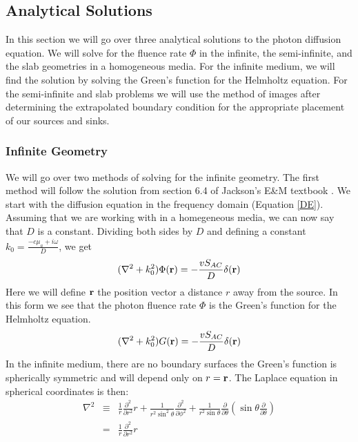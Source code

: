 \subsection{Analytical Solutions}
In this section we will go over three analytical solutions to the photon diffusion equation. We will solve for the fluence rate $\Phi$ in the infinite, the semi-infinite, and the slab geometries in a homogeneous media. For the infinite medium, we will find the solution by solving the Green's function for the Helmholtz
equation. For the semi-infinite and slab problems we will use the method of images after determining the extrapolated boundary condition for the appropriate placement of our sources and sinks.
\subsubsection{Infinite Geometry}
We will go over two methods of solving for the infinite geometry. The first method will follow the solution from section 6.4 of Jackson's E\&M textbook \cite{JacksonEM}. We start with the diffusion equation in the frequency domain (Equation \ref{DE}). Assuming that we are working with in a homegeneous media, we can now say that $D$ is a constant. Dividing both sides by $D$ and defining a constant $k_0 = \frac{- c\mu_a + i\omega}{D}$, we get 
\begin{equation}
\label{DEHelm}
(\nabla^2+k_0^2)\Phi({\bf r})=-\frac{vS_{AC}}{D}\delta({\bf r})
\end{equation}
\noindent
Here we will define ${\bf r}$ the position vector a distance $r$ away from the source. In this form we see that the photon fluence rate $\Phi$ is the Green's function for the Helmholtz equation.
\begin{equation}
\label{greenHelm}
(\nabla^2+k_0^2)G({\bf r})=-\frac{vS_{AC}}{D}\delta({\bf r})
\end{equation}
\noindent
In the infinite medium, there are no boundary surfaces the Green's function is spherically symmetric and will depend only on $r={\bf r}$. The Laplace equation in spherical coordinates is then:
\begin{eqnarray}
\label{laplacian}
\nabla^2 & \equiv & \frac{1}{r}\frac{\partial^2}{\partial r^2}r 
+ \frac{1}{r^2\sin^2\theta}\frac{\partial^2}{\partial\phi^2}
+ \frac{1}{r^2\sin\theta}\frac{\partial}
{\partial\theta}\left(\sin\theta\frac{\partial}{\partial\theta}\right)
\nonumber \\
& = & \frac{1}{r}\frac{\partial^2}{\partial r^2}r
\end{eqnarray}

